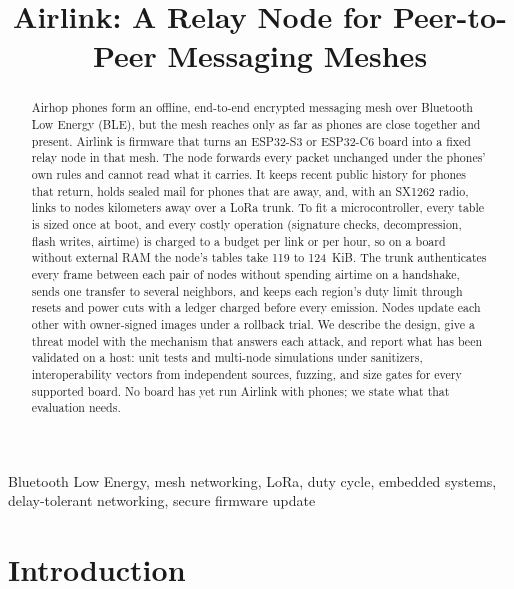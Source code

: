 \documentclass[conference]{IEEEtran}
\begin{document}
\title{Airlink: A Relay Node for Peer-to-Peer Messaging Meshes}

\author{
}

\maketitle

\begin{abstract}
Airhop phones form an offline, end-to-end encrypted messaging mesh over Bluetooth Low Energy (BLE), but the mesh reaches only as far as phones are close together and present. Airlink is firmware that turns an ESP32-S3 or ESP32-C6 board into a fixed relay node in that mesh. The node forwards every packet unchanged under the phones' own rules and cannot read what it carries. It keeps recent public history for phones that return, holds sealed mail for phones that are away, and, with an SX1262 radio, links to nodes kilometers away over a LoRa trunk. To fit a microcontroller, every table is sized once at boot, and every costly operation (signature checks, decompression, flash writes, airtime) is charged to a budget per link or per hour, so on a board without external RAM the node's tables take 119 to 124~KiB. The trunk authenticates every frame between each pair of nodes without spending airtime on a handshake, sends one transfer to several neighbors, and keeps each region's duty limit through resets and power cuts with a ledger charged before every emission. Nodes update each other with owner-signed images under a rollback trial. We describe the design, give a threat model with the mechanism that answers each attack, and report what has been validated on a host: unit tests and multi-node simulations under sanitizers, interoperability vectors from independent sources, fuzzing, and size gates for every supported board. No board has yet run Airlink with phones; we state what that evaluation needs.
\end{abstract}

\begin{IEEEkeywords}
Bluetooth Low Energy, mesh networking, LoRa, duty cycle, embedded systems, delay-tolerant networking, secure firmware update
\end{IEEEkeywords}

\section{Introduction}
\label{sec:intro}
\end{document}
